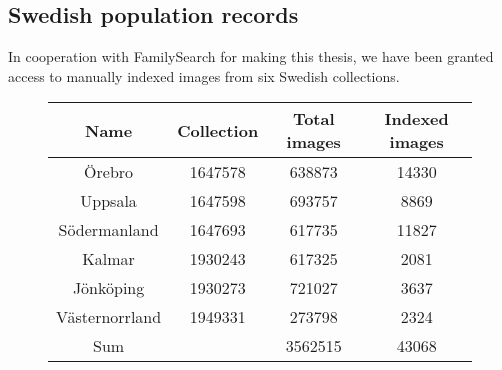 \subsection{Swedish population records}

In cooperation with FamilySearch for making this thesis, we have been granted access to manually indexed images from six Swedish collections.

\begin{figure}
\centering
\begin{tabular}{c c c c}
Name & Collection & Total images & Indexed images \\
\hline
Örebro	& 1647578	& 638873	& 14330 \\
Uppsala	& 1647598	& 693757	& 8869 \\
Södermanland	& 1647693	& 617735	& 11827 \\
Kalmar	& 1930243	& 617325	& 2081 \\
Jönköping	& 1930273	& 721027	& 3637 \\
Västernorrland	& 1949331	& 273798	& 2324 \\
\hline
Sum & & 3562515 & 43068
\end{tabular}
\end{figure}
